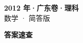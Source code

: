 \documentclass[zihao=-4, a4paper]{ctexart}
\begin{document}
\begin{center}
  {\Large\bfseries 2012 年·广东卷·理科}\\[4pt]
  {\large 数学 · 简答版}
\end{center}
\medskip
{}

\clearpage
{}
\begin{center}{\Large\bfseries 答案速查}\end{center}
\medskip

\end{document}
